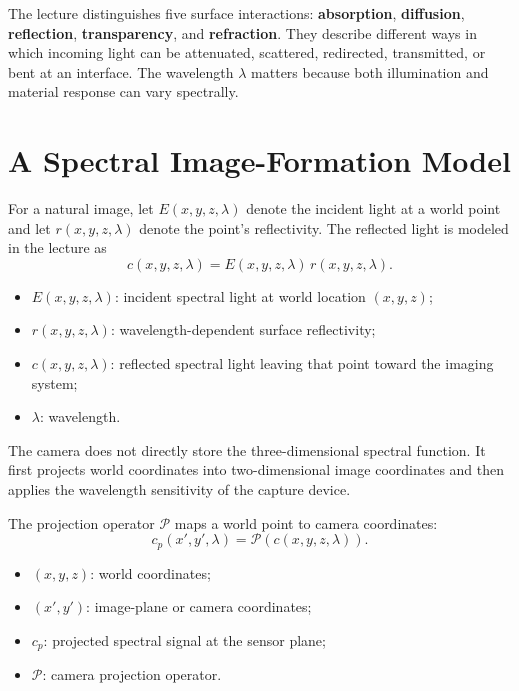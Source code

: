 \documentclass[11pt,a4paper,oneside]{report}
\newcommand{\mathlegend}[1]{%
  \par\vspace{0.2em}{\small\itshape where}\par
  \begin{itemize}[leftmargin=1.7em,topsep=0.15em,itemsep=0.12em]
  #1
  \end{itemize}
}
\begin{document}
The lecture distinguishes five surface interactions: \textbf{absorption}, \textbf{diffusion}, \textbf{reflection}, \textbf{transparency}, and \textbf{refraction}. They describe different ways in which incoming light can be attenuated, scattered, redirected, transmitted, or bent at an interface. The wavelength $\lambda$ matters because both illumination and material response can vary spectrally.

\section{A Spectral Image-Formation Model}

For a natural image, let $E(x,y,z,\lambda)$ denote the incident light at a world point and let $r(x,y,z,\lambda)$ denote the point's reflectivity. The reflected light is modeled in the lecture as
\begin{equation}
  c(x,y,z,\lambda)=E(x,y,z,\lambda)\,r(x,y,z,\lambda).
  \label{eq:reflected-light}
\end{equation}
\mathlegend{
  \item $E(x,y,z,\lambda)$: incident spectral light at world location $(x,y,z)$;
  \item $r(x,y,z,\lambda)$: wavelength-dependent surface reflectivity;
  \item $c(x,y,z,\lambda)$: reflected spectral light leaving that point toward the imaging system;
  \item $\lambda$: wavelength.
}

\begin{keyconcept}
The camera does not directly store the three-dimensional spectral function. It first projects world coordinates into two-dimensional image coordinates and then applies the wavelength sensitivity of the capture device.
\end{keyconcept}

The projection operator $\mathcal{P}$ maps a world point to camera coordinates:
\begin{equation}
  c_p(x',y',\lambda)=\mathcal{P}\!\left(c(x,y,z,\lambda)\right).
  \label{eq:projection-spectral}
\end{equation}
\mathlegend{
  \item $(x,y,z)$: world coordinates;
  \item $(x',y')$: image-plane or camera coordinates;
  \item $c_p$: projected spectral signal at the sensor plane;
  \item $\mathcal{P}$: camera projection operator.
}
\end{document}

